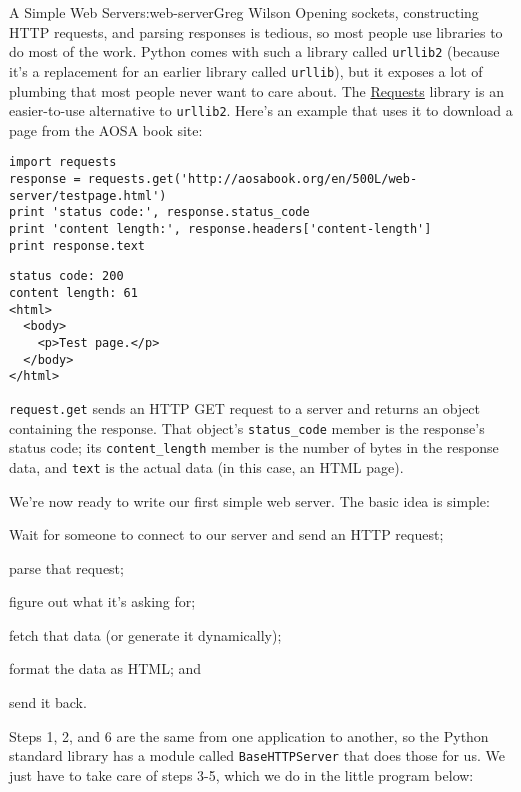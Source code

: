 \begin{aosachapter}{A Simple Web Server}{s:web-server}{Greg Wilson}
Opening sockets, constructing HTTP requests, and parsing responses is
tedious, so most people use libraries to do most of the work. Python
comes with such a library called \texttt{urllib2} (because it's a
replacement for an earlier library called \texttt{urllib}), but it
exposes a lot of plumbing that most people never want to care about. The
\href{https://pypi.python.org/pypi/requests}{Requests} library is an
easier-to-use alternative to \texttt{urllib2}. Here's an example that
uses it to download a page from the AOSA book site:

\begin{verbatim}
import requests
response = requests.get('http://aosabook.org/en/500L/web-server/testpage.html')
print 'status code:', response.status_code
print 'content length:', response.headers['content-length']
print response.text
\end{verbatim}

\begin{verbatim}
status code: 200
content length: 61
<html>
  <body>
    <p>Test page.</p>
  </body>
</html>
\end{verbatim}

\texttt{request.get} sends an HTTP GET request to a server and returns
an object containing the response. That object's \texttt{status\_code}
member is the response's status code; its \texttt{content\_length}
member is the number of bytes in the response data, and \texttt{text} is
the actual data (in this case, an HTML page).

\label{hello-web}

We're now ready to write our first simple web server. The basic idea is
simple:

\begin{aosaenumerate}
\def\labelenumi{\arabic{enumi}.}

\item
  Wait for someone to connect to our server and send an HTTP request;
\item
  parse that request;
\item
  figure out what it's asking for;
\item
  fetch that data (or generate it dynamically);
\item
  format the data as HTML; and
\item
  send it back.
\end{aosaenumerate}

Steps 1, 2, and 6 are the same from one application to another, so the
Python standard library has a module called \texttt{BaseHTTPServer} that
does those for us. We just have to take care of steps 3-5, which we do
in the little program below:


\end{aosachapter}
